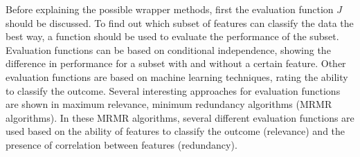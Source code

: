 \documentclass[10pt,a4paper]{article}
\begin{document}
	Before explaining the possible wrapper methods, first the evaluation function $J$ should be discussed. To find out which subset of features can classify the data the best way, a function should be used to evaluate the performance of the subset\cite{Reunanen2006}. Evaluation functions can be based on conditional independence\cite{Reunanen2006,tsamardinos2017massively}, showing the difference in performance for a subset with and without a certain feature. Other evaluation functions are based on machine learning techniques\cite{huang2013automated, saeys2007review}, rating the ability to classify the outcome. Several interesting approaches for evaluation functions are shown in maximum relevance, minimum redundancy algorithms\cite{SENAWI201747, el2009new, radovic2017minimum} (MRMR algorithms). In these MRMR algorithms, several different evaluation functions are used based on the ability of features to classify the outcome (relevance) and the presence of correlation between features (redundancy).
	
\end{document}
